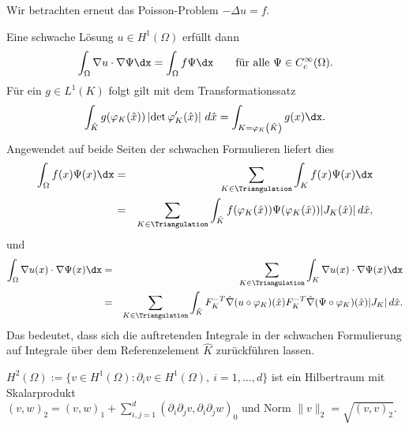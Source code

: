 \begin{Anwendung}
    Wir betrachten erneut das Poisson-Problem $-\Delta u = f$.
    
    Eine schwache Lösung $u \in H^1(\Omega)$ erfüllt dann
    \begin{eqnarray*}
        \int_\Omega \nabla u \cdot \nabla \Psi \dx = \int_\Omega f \Psi \dx
            \qquad \text{für alle } \Psi \in C_c^\infty(\Omega).
    \end{eqnarray*}
    Für ein $g \in L^1(K)$ folgt gilt mit dem Transformationssatz
    \begin{eqnarray*}
        \int_{\hat K} g(\varphi_K(\hat x)) \left|\det \varphi_K^\prime(\hat x)
        \right| \,d\hat x
        = \int_{K=\varphi_K\left(\hat K\right)} g(x) \dx.
    \end{eqnarray*}
    Angewendet auf beide Seiten der schwachen Formulieren liefert dies
    \begin{eqnarray*}
            \int_\Omega f(x) \Psi(x) \dx
        &=& \sum_{K\in\Triangulation} \int_K f(x) \Psi(x) \dx \\
        &=& \sum_{K\in\Triangulation} \int_{\hat K} f(\varphi_K(\hat x))
            \Psi(\varphi_K(\hat x)) |J_K(\hat x)| \,d\hat x,
    \end{eqnarray*}
    und
    \begin{eqnarray*}
            \int_\Omega \nabla u(x) \cdot \nabla \Psi(x) \dx
        &=& \sum_{K\in\Triangulation} \int_K \nabla u(x) \cdot \nabla \Psi(x)
            \dx \\
        &=& \sum_{K\in\Triangulation} \int_{\hat K} F_K^{-T} \hat \nabla
            (u \circ \varphi_K)(\hat x) F_K^{-T} \hat \nabla (\Psi \circ
            \varphi_K) (\hat x) |J_K| \,d\hat x.
    \end{eqnarray*}
    Das bedeutet, dass sich die auftretenden Integrale in der schwachen Formulierung auf Integrale über dem Referenzelement $\hat{K}$ zurückführen lassen.
\end{Anwendung}


\begin{Definition}
    \label{def:3.12}
    $H^2(\Omega) := \{v \in H^1(\Omega): \partial_i v \in H^1(\Omega),\ i=1,\dots,d\}$
    ist ein Hilbertraum mit Skalarprodukt \\
    $(v,w)_2 = (v,w)_1 + \sum_{i,j=1}^d (\partial_i \partial_j v,
    \partial_i \partial_j w)_0$
    und Norm
    $\|v\|_2 = \sqrt{(v,v)_2}$.
\end{Definition}


